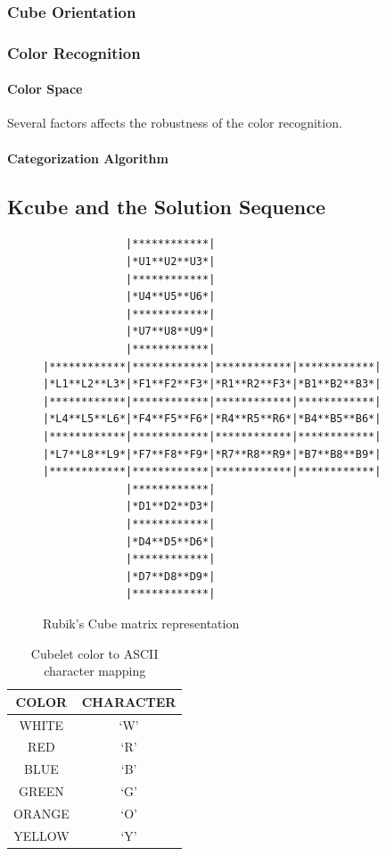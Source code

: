 \documentclass[final, letterpaper, 10 pt, conference, twocolumn]{IEEEtran}
\begin{document}
\subsubsection{Cube Orientation}
\subsubsection{Color Recognition}
\paragraph{Color Space}
Several factors affects the robustness of the color recognition. 
\paragraph{Categorization Algorithm}


\subsection{Kcube and the Solution Sequence}
\begin{figure}[!ht]
\begin{center}
\begin{BVerbatim}
             |************|
             |*U1**U2**U3*|
             |************|
             |*U4**U5**U6*|
             |************|
             |*U7**U8**U9*|
             |************|
|************|************|************|************|
|*L1**L2**L3*|*F1**F2**F3*|*R1**R2**F3*|*B1**B2**B3*|
|************|************|************|************|
|*L4**L5**L6*|*F4**F5**F6*|*R4**R5**R6*|*B4**B5**B6*|
|************|************|************|************|
|*L7**L8**L9*|*F7**F8**F9*|*R7**R8**R9*|*B7**B8**B9*|
|************|************|************|************|
             |************|
             |*D1**D2**D3*|
             |************|
             |*D4**D5**D6*|
             |************|
             |*D7**D8**D9*|
             |************|
\end{BVerbatim}
\end{center}
\caption{Rubik's Cube matrix representation}
\label{fig:matrix layout}
\end{figure}

\begin{table}[!ht]
\caption{Cubelet color to ASCII character mapping}
\label{table:cubelet representation}
\centering
\begin{tabular}{|c|c|}
\hline
\textbf{COLOR} & \textbf{CHARACTER} \\ \hline
WHITE          & `W'              \\ \hline
RED            & `R'              \\ \hline
BLUE           & `B'              \\ \hline
GREEN          & `G'              \\ \hline
ORANGE         & `O'              \\ \hline
YELLOW         & `Y'              \\ \hline
\end{tabular}
\end{table}
\end{document}
